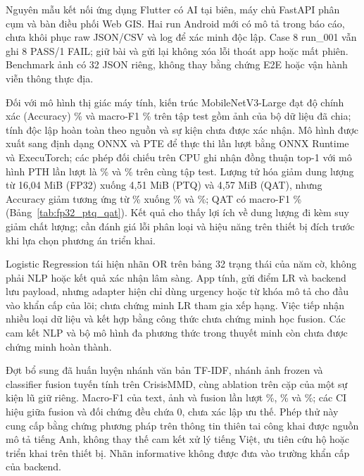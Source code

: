 \label{chap:conclusion}
Nguyên mẫu kết nối ứng dụng Flutter có AI tại biên, máy chủ FastAPI phân cụm và bàn điều phối Web GIS. Hai run Android mới có mô tả trong báo cáo, chưa khôi phục raw JSON/CSV và log để xác minh độc lập. Case 8 run\_001 vẫn ghi 8 PASS/1 FAIL; giữ bài và gửi lại không xóa lỗi thoát app hoặc mất phiên. Benchmark ảnh có 32 JSON riêng, không thay bằng chứng E2E hoặc vận hành viễn thông thực địa.

Đối với mô hình thị giác máy tính, kiến trúc MobileNetV3-Large đạt độ chính xác (Accuracy) \NewImageAccuracy\% và macro-F1 \NewImageMacroFOne\% trên tập test gồm \ImageTest{} ảnh của bộ dữ liệu đã chia; tính độc lập hoàn toàn theo nguồn và sự kiện chưa được xác nhận. Mô hình được xuất sang định dạng ONNX và PTE để thực thi lần lượt bằng ONNX Runtime và ExecuTorch; các phép đối chiếu trên CPU ghi nhận đồng thuận top-1 với mô hình PTH lần lượt là \CpuOnnxAgreement\% và \CpuPteAgreement\% trên cùng tập test. Lượng tử hóa giảm dung lượng từ 16,04 MiB (FP32) xuống 4,51 MiB (PTQ) và 4,57 MiB (QAT), nhưng Accuracy giảm tương ứng từ \NewImageAccuracy\% xuống \PTQAccuracy\% và \QATAccuracy\%; QAT có macro-F1 \QATMacroFOne\% (Bảng~\ref{tab:fp32_ptq_qat}). Kết quả cho thấy lợi ích về dung lượng đi kèm suy giảm chất lượng; cần đánh giá lỗi phân loại và hiệu năng trên thiết bị đích trước khi lựa chọn phương án triển khai.

Logistic Regression tái hiện nhãn OR trên bảng 32 trạng thái của năm cờ, không phải NLP hoặc kết quả xác nhận lâm sàng. App tính, gửi điểm LR và backend lưu payload, nhưng adapter hiện chỉ dùng urgency hoặc từ khóa mô tả cho đầu vào khẩn cấp của lõi; chưa chứng minh LR tham gia xếp hạng. Việc tiếp nhận nhiều loại dữ liệu và kết hợp bằng công thức chưa chứng minh học fusion. Các cam kết NLP và bộ mô hình đa phương thức trong thuyết minh còn chưa được chứng minh hoàn thành.

Đợt bổ sung đã huấn luyện nhánh văn bản TF-IDF, nhánh ảnh frozen và classifier fusion tuyến tính trên CrisisMMD, cùng ablation trên \MMTestN{} cặp của một sự kiện lũ giữ riêng. Macro-F1 của text, ảnh và fusion lần lượt \MMTextFOne\%, \MMImageFOne\% và \MMFusionFOne\%; các CI hiệu giữa fusion và đối chứng đều chứa 0, chưa xác lập ưu thế. Phép thử này cung cấp bằng chứng phương pháp trên thông tin thiên tai công khai được nguồn mô tả tiếng Anh, không thay thế cam kết xử lý tiếng Việt, ưu tiên cứu hộ hoặc triển khai trên thiết bị. Nhãn informative không được đưa vào trường khẩn cấp của backend.

